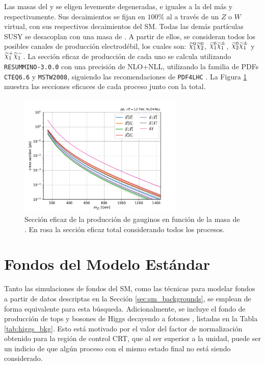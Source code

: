 Las masas del \ninotwo y \chinopm se eligen levemente degeneradas, e iguales a la del \ninoone más  y  respectivamente. 
Sus decaimientos se fijan en $100\%$ al \ninoone a través de un $Z$ o $W$ virtual, con sus respectivos decaimientos del SM. Todas las demás partículas SUSY se desacoplan con una masa de . A partir de ellos, se consideran todos los posibles canales de producción electrodébil, los cuales son: $\ninoone \ninotwo$, $\ninoone \chinoonepm$, $\ninotwo \chinoonepm$ y $\chinoonep \chinoonem$. La sección eficaz de producción de cada uno se calcula utilizando \texttt{RESUMMINO-3.0.0} \cite{Beenakker:1999xh,Debove:2010kf,Fuks:2012qx,Fuks:2013vua,Fiaschi:2018hgm} con una precisión de NLO+NLL, utilizando la familia de PDFs \texttt{CTEQ6.6} y \texttt{MSTW2008}, siguiendo las recomendaciones de \texttt{PDF4LHC} \cite{Butterworth:2015oua}. La Figura \ref{fig:SUSY_EWK_xs} muestra las secciones eficaces de cada proceso junto con la total.

\begin{figure}
  \centering
  \includegraphics[width=0.7\textwidth]{images/analysis_EWK/SUSY_EWK_xsecs_m.pdf}
  \caption{Sección eficaz de la producción de gauginos en función de la masa de \ninoone. En rosa la sección eficaz total considerando todos los procesos.}
  \label{fig:SUSY_EWK_xs}
\end{figure}



\section{Fondos del Modelo Estándar}

Tanto las simulaciones de fondos del SM, como las técnicas para modelar fondos a partir de datos descriptas en la Sección \ref{sec:sm_backgrounds}, se emplean de forma equivalente para esta búsqueda. Adicionalmente, se incluye el fondo de producción de tops y bosones de Higgs decayendo a fotones \cite{tesis_jose}, listadas en la Tabla \ref{tab:higgs_bkg}. Esto está motivado por el valor del factor de normalización obtenido para la región de control CRT, que al ser superior a la unidad, puede ser un indicio de que algún proceso con el mismo estado final no está siendo considerado.

